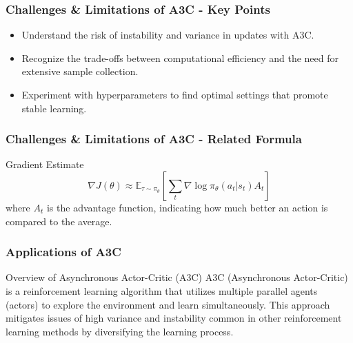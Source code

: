 \documentclass{beamer}
\begin{document}
\begin{frame}[fragile]
    \frametitle{Challenges \& Limitations of A3C - Key Points}
    \begin{itemize}
        \item Understand the risk of instability and variance in updates with A3C.
        \item Recognize the trade-offs between computational efficiency and the need for extensive sample collection.
        \item Experiment with hyperparameters to find optimal settings that promote stable learning.
    \end{itemize}
\end{frame}

\begin{frame}[fragile]
    \frametitle{Challenges \& Limitations of A3C - Related Formula}
    \begin{block}{Gradient Estimate}
        \begin{equation}
            \nabla J(\theta) \approx \mathbb{E}_{\tau \sim \pi_\theta} \left[ \sum_{t} \nabla \log \pi_\theta(a_t | s_t) A_t \right]
        \end{equation}
        where \( A_t \) is the advantage function, indicating how much better an action is compared to the average.
    \end{block}
\end{frame}

\begin{frame}[fragile]
    \frametitle{Applications of A3C}
    \begin{block}{Overview of Asynchronous Actor-Critic (A3C)}
        A3C (Asynchronous Actor-Critic) is a reinforcement learning algorithm that utilizes multiple parallel agents (actors) to explore the environment and learn simultaneously. This approach mitigates issues of high variance and instability common in other reinforcement learning methods by diversifying the learning process.
    \end{block}
\end{frame}
\end{document}
